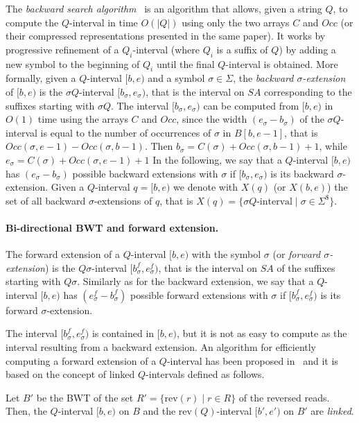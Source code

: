 \documentclass[runningheads,envcountsame,a4paper]{llncs}
\newcommand{\rev}{\ensuremath{\mathrm{rev}}}
\newcommand{\SA}{\ensuremath{\textit{SA}}}
\newcommand{\Occ}{\ensuremath{\textit{Occ}}}
\begin{document}
The \emph{backward search algorithm}~\cite{Ferragina2005} is an
algorithm that allows, given a string $Q$, to compute the $Q$-interval
in time $O(|Q|)$ using only the two arrays $C$ and $\Occ$ (or their
compressed representations presented in the same paper).
It works by progressive refinement of a $Q_i$-interval (where $Q_i$ is a
suffix of $Q$) by adding a new symbol to the beginning of $Q_i$ until the
final $Q$-interval is obtained.
More formally, given a $Q$-interval $[b,e)$ and a symbol $\sigma \in
\Sigma$, the \emph{backward $\sigma$-extension} of $[b,e)$ is the
$\sigma Q$-interval $[b_{\sigma},e_{\sigma})$, that is the interval on
$\SA$ corresponding to the suffixes starting with $\sigma Q$.
The interval $[b_{\sigma}, e_{\sigma})$ can be computed from $[b,e)$ in
$O(1)$ time using the arrays $C$ and $\Occ$, since the width
$(e_{\sigma}-b_{\sigma})$ of the $\sigma Q$-interval is equal to the
number of occurrences of $\sigma$ in $B[b, e-1]$, that is
$\Occ(\sigma, e-1)-\Occ(\sigma, b-1)$.
Then $b_{\sigma} =C(\sigma) + \Occ(\sigma, b-1) + 1$,
while $e_{\sigma} =C(\sigma) + \Occ(\sigma, e-1) + 1$
In the following, we say that a $Q$-interval $[b,e)$ has
$(e_{\sigma}-b_{\sigma})$ possible backward extensions with $\sigma$ if
$[b_{\sigma},e_{\sigma})$ is its backward $\sigma$-extension.
Given a $Q$-interval $q=[b,e)$ we denote with $X(q)$ (or $X(b,e)$)
the set of all backward $\sigma$-extensions of $q$, that is $X(q)=\{
\sigma Q\text{-interval} \mid \sigma\in\Sigma^\$\}$.

\paragraph{Bi-directional BWT and forward extension.}
The forward extension of a $Q$-interval $[b,e)$ with the symbol
$\sigma$ (or \emph{forward $\sigma$-extension}) is the $Q
\sigma$-interval $[b^f_{\sigma},e^f_{\sigma})$, that is the interval on
$\SA$ of the suffixes starting with $Q \sigma$.
Similarly as for the backward extension, we say that a $Q$-interval
$[b,e)$ has $(e^f_{\sigma}-b^f_{\sigma})$ possible forward extensions
with $\sigma$ if $[b^f_{\sigma},e^f_{\sigma})$ is its forward
$\sigma$-extension.

The interval $[b^f_{\sigma},e^f_{\sigma})$ is contained in $[b,e)$, but
it is not as easy to compute as the interval resulting from a backward
extension.
An algorithm for efficiently computing a forward extension of a
$Q$-interval has been proposed in~\cite{Lam2009,Simpson2010} and it is
based on the concept of linked $Q$-intervals defined as follows.
\begin{definition}
Let $B'$ be the BWT of the set $R' = \{ \rev(r) \mid r \in R\}$ of the
reversed reads.
Then, the $Q$-interval $[b,e)$ on $B$ and the $\rev(Q)$-interval
$[b',e')$ on $B'$ are \emph{linked}.
\end{definition}
\end{document}
